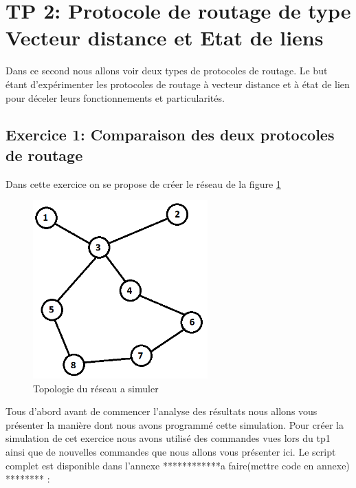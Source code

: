\documentclass[11pt]{article}
\begin{document}
\pagebreak
\section{TP 2: Protocole de routage de type Vecteur distance et Etat de liens}
Dans ce second nous allons voir deux types de protocoles de routage. Le but étant d’expérimenter les protocoles de routage à vecteur distance et à état de lien pour déceler leurs fonctionnements et particularités.

\subsection{Exercice 1: Comparaison des deux protocoles de routage}
Dans cette exercice on se propose de créer le réseau de la figure \ref{resAReal}
\begin{figure}[H]
	\begin{center}
		\includegraphics[width=0.6\textwidth]{assets/tp2/reasauRealiser.png}
	\end{center}
	\caption{Topologie du réseau a simuler}
	\label{resAReal}
\end{figure}


Tous d’abord avant de commencer l’analyse des résultats nous allons vous présenter la manière dont nous avons programmé cette simulation. Pour créer la simulation de cet exercice nous avons utilisé des commandes vues lors du tp1 ainsi que de nouvelles commandes que nous allons vous présenter ici. Le script complet est disponible dans l'annexe ************a faire(mettre code en annexe) ******** :
\end{document}
